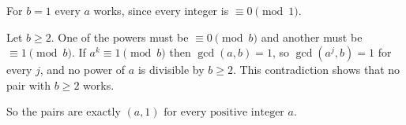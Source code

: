 For $b=1$ every $a$ works, since every integer is $\equiv0\pmod1$.

Let $b\ge2$. One of the powers must be $\equiv0\pmod b$ and another must be $\equiv1\pmod b$. If $a^k\equiv1\pmod b$ then $\gcd(a,b)=1$, so $\gcd(a^j,b)=1$ for every $j$, and no power of $a$ is divisible by $b\ge2$. This contradiction shows that no pair with $b\ge2$ works.

So the pairs are exactly $\boxed{(a,1)\text{ for every positive integer }a}$.
